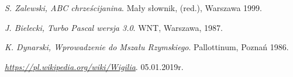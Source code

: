 \documentclass[11pt]{book}
\begin{document}
\begin{thebibliography}{9}
\emph{S. Zalewski, ABC chrześcijanina}. Mały słownik, (red.), Warszawa 1999. 

\emph{J. Bielecki, Turbo Pascal wersja 3.0}. WNT, Warszawa, 1987.

\emph{K. Dynarski, Wprowadzenie do Mszału Rzymskiego}. Pallottinum, Poznań 1986.

\emph{\href{https://pl.wikipedia.org/wiki/Wigilia}{https://pl.wikipedia.org/wiki/Wigilia}}. 05.01.2019r.

\end{thebibliography}




	
\end{document}

